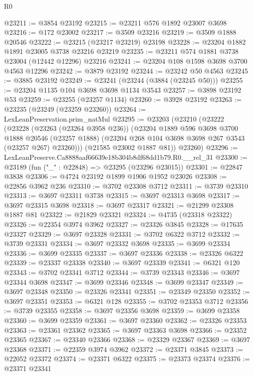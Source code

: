 \begin{lexlean}{R0}
\begin{coremodule}
@23211 := @3854 @23192
@23215 := @23211 @576 @1892 @23007 @3698
@23216 := @172 @23002
@23217 := @3509 @23216
@23219 := @3509 @1888 @20546
@23222 := @23215 (@23217 @23219) @23198
@23228 := @23204 @1882 @1891 @23005 @3738 @23216 @23219
@23235 := @23211 @574 @1881 @3738 @23004 (@12442 @12296) @23216
@23241 := @23204 @108 @1598 @3698 @3700 @4563 @12296
@23242 := @3879 @23192
@23244 := @23242 @50 @4563
@23245 := @3885 @23192
@23249 := @23241 (@23244 (@3884 (@23245 @50)))
@23255 := @23204 @1135 @104 @3698 @3698 @1134 @3543
@23257 := @3898 @23192 @53
@23259 := @23255 (@23257 @1134)
@23260 := @3928 @23192
@23263 := @23235 (@23249 (@23259 @23260))
@23264 := LexLeanPreservation.prim_natMul
@23295 := @23203
    (@23210
      (@23222
        (@23228
          (@23263 (@23264 @3958 @236))
          (@23204
            @1889
            @596
            @3698
            @3700
            @1888
            @20546
            (@23257 @1888)
            (@23204 @268 @104 @3698 @3698 @267 @3543 (@23257 @267) @23260)))
        (@21585 @23002 @1887 @81))
      @23260)
@23296 := LexLeanPreserve.Ca8888aaf66639e18b304b8df68dd1b79.R0.__rel_31
@23300 := @23189 (fun ("_" : @22848) => @23295 (@23296 @23015))
@23301 := @22847 @3838
@23306 := @4724 @23192 @1899 @1906 @1952 @23026
@23308 := @22856 @3962 @236
@23310 := @3702 @23308 @3712
@23311 := @3739 @23310
@23313 := @3697 @23311 @3738
@23315 := @3697 @23313 @3698
@23317 := @3697 @23315 @3698
@23318 := @3697 @23317
@23321 := @21299 @23308 @1887 @81
@23322 := @21829 @23321
@23324 := @4735 (@23318 @23322)
@23326 := @22354 @3974 @3962
@23327 := @23326 @3845
@23328 := @17635 @23327
@23329 := @3697 @23328
@23331 := @3702 @6322 @3712
@23332 := @3739 @23331
@23334 := @3697 @23332 @3698
@23335 := @3699 @23334
@23336 := @3699 @23335
@23337 := @3697 @23336
@23338 := @23326 @6322
@23339 := @23337 @23338
@23340 := @3697 @23339
@23341 := @6321 @120
@23343 := @3702 @23341 @3712
@23344 := @3739 @23343
@23346 := @3697 @23344 @3698
@23347 := @3699 @23346
@23348 := @3699 @23347
@23349 := @3697 @23348
@23350 := @23326 @23341
@23351 := @23349 @23350
@23352 := @3697 @23351
@23353 := @6321 @128
@23355 := @3702 @23353 @3712
@23356 := @3739 @23355
@23358 := @3697 @23356 @3698
@23359 := @3699 @23358
@23360 := @3699 @23359
@23361 := @3697 @23360
@23362 := @23326 @23353
@23363 := @23361 @23362
@23365 := @3697 @23363 @3698
@23366 := @23352 @23365
@23367 := @23340 @23366
@23368 := @23329 @23367
@23369 := @3697 @23368
@23371 := @22359 @3974 @3962
@23372 := @23371 @3845
@23373 := @22052 @23372
@23374 := @23371 @6322
@23375 := @23373 @23374
@23376 := @23371 @23341

\end{coremodule}
\end{lexlean}
